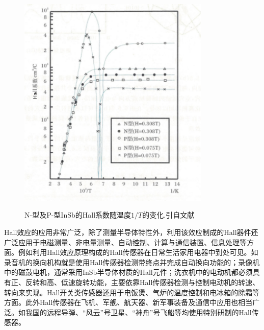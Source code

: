 \begin{figure}[h!]
\centering
\vspace*{-0.10in}
\includegraphics[height=4.30in,width=3.60in,viewport=0 0 75 90,clip]{Figures/InSb-Hall-coeffectivity.png}
\caption{\small \textrm{N-型及P-型InSb的Hall系数随温度$1/T$的变化.引自文献}}%
\label{Fig:Hall_effect-R}
\end{figure}

Hall效应的应用非常广泛，除了测量半导体特性外，利用该效应制成的Hall器件还广泛应用于电磁测量、非电量测量、自动控制、计算与通信装置、信息处理等方面。例如利用Hall效应原理构成的Hall传感器在日常生活家用电器中到处可见。如录音机的换向机构就是使用Hall传感器检测带终点并完成自动换向功能的；录像机中的磁鼓电机，通常采用InSb半导体材质的Hall元件；洗衣机中的电动机都必须具有正、反转和高、低速旋转功能，主要依靠Hall传感器检测与控制电动机的转速、转向来实现。Hall开关类传感器还用于电饭煲、气炉的温度控制和电冰箱的除霜等方面。此外Hall传感器在飞机、军舰、航天器、新军事装备及通信中应用也相当广泛。如我国的远程导弹、``风云''号卫星、``神舟''号飞船等均使用特别研制的Hall传感器。

